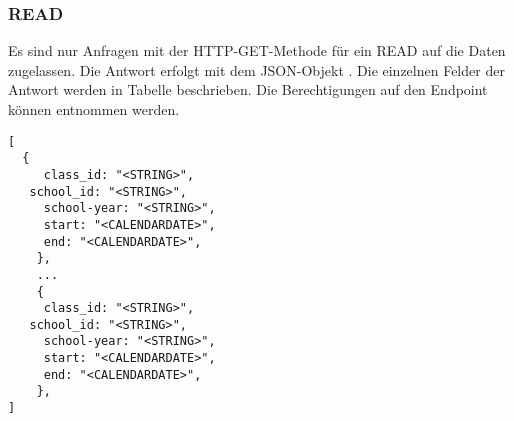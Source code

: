 \subsubsection{READ}
\label{sec:rest:api:user:classes:read}
Es sind nur Anfragen mit der HTTP-GET-Methode für ein READ auf die Daten zugelassen.
Die Antwort erfolgt mit dem JSON-Objekt . Die einzelnen Felder der Antwort werden in Tabelle  beschrieben.
Die Berechtigungen auf den Endpoint können  entnommen werden.

\begin{lstlisting}[caption={JSON-Antwort für einen GET-Aufruf der Route /api/user/classes},label={lst:code:rest:api:user:classes:read:ret},frame=tlrb]
[
  {
	 class_id: "<STRING>",
   school_id: "<STRING>",
	 school-year: "<STRING>",
	 start: "<CALENDARDATE>",
	 end: "<CALENDARDATE>",
	}, 
	...
	{
	 class_id: "<STRING>",
   school_id: "<STRING>",
	 school-year: "<STRING>",
	 start: "<CALENDARDATE>",
	 end: "<CALENDARDATE>",
	}, 
]
\end{lstlisting}
